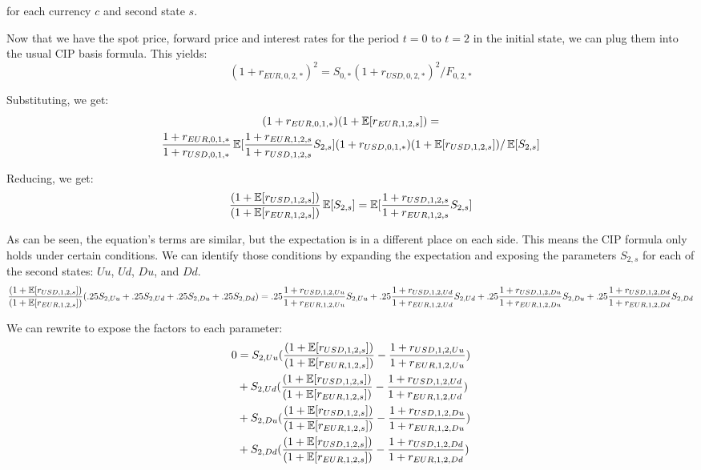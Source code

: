 \noindent for each currency $c$ and second state $s$.

Now that we have the spot price, forward price and interest rates for the period $t=0$ to $t=2$ in the initial state, we can plug them into the usual CIP basis formula.  This yields:
\begin{equation}
  (1 + r_{EUR,0,2,*})^2 = S_{0,*}(1 + r_{USD,0,2,*})^2/F_{0,2,*}
\end{equation}

Substituting, we get:
\begin{multline}
  (1 + r_{EUR,0,1,*})(1 + \operatorname{\mathbb{E}}[r_{EUR,1,2,s}]) =  \\ \frac{1+r_{EUR,0,1,*}}{1 + r_{USD,0,1,*}}\operatorname{\mathbb{E}}[\frac{1+r_{EUR,1,2,s}}{1 + r_{USD,1,2,s}} S_{2,s}](1 + r_{USD,0,1,*})(1 + \operatorname{\mathbb{E}}[r_{USD,1,2,s}])/\operatorname{\mathbb{E}}[S_{2,s}]
\end{multline}

Reducing, we get:
\begin{equation}
  \frac{(1 +\operatorname{\mathbb{E}}[r_{USD,1,2,s}])}{(1 +\operatorname{\mathbb{E}}[r_{EUR,1,2,s}])} \operatorname{\mathbb{E}}[S_{2,s}] = \operatorname{\mathbb{E}}[\frac{1+r_{USD,1,2,s}}{1 + r_{EUR,1,2,s}} S_{2,s}]
\end{equation}

As can be seen, the equation's terms are similar, but the expectation is in a different place on each side.  This means the CIP formula only holds under certain conditions.  We can identify those conditions by expanding the expectation and exposing the parameters $S_{2,s}$ for each of the second states: $Uu$, $Ud$, $Du$, and $Dd$.
\begin{equation}
  \frac{(1 +\operatorname{\mathbb{E}}[r_{USD,1,2,s}])}{(1 +\operatorname{\mathbb{E}}[r_{EUR,1,2,s}])} (.25S_{2,Uu}+.25S_{2,Ud}+.25S_{2,Du}+.25S_{2,Dd})  = 
.25\frac{1+r_{USD,1,2,Uu}}{1 + r_{EUR,1,2,Uu}}S_{2,Uu} + .25\frac{1+r_{USD,1,2,Ud}}{1 + r_{EUR,1,2,Ud}}S_{2,Ud} + .25\frac{1+r_{USD,1,2,Du}}{1 + r_{EUR,1,2,Du}}S_{2,Du} + .25\frac{1+r_{USD,1,2,Dd}}{1 + r_{EUR,1,2,Dd}}S_{2,Dd}
\end{equation}

We can rewrite to expose the factors to each parameter:
\begin{align}
  0 &= S_{2,Uu}( \frac{(1 +\operatorname{\mathbb{E}}[r_{USD,1,2,s}])}{(1 +\operatorname{\mathbb{E}}[r_{EUR,1,2,s}])} - \frac{1+r_{USD,1,2,Uu}}{1 + r_{EUR,1,2,Uu}}) \\
     &+ S_{2,Ud}(\frac{(1 +\operatorname{\mathbb{E}}[r_{USD,1,2,s}])}{(1 +\operatorname{\mathbb{E}}[r_{EUR,1,2,s}])} - \frac{1+r_{USD,1,2,Ud}}{1 + r_{EUR,1,2,Ud}}) \\
     &+ S_{2,Du}(\frac{(1 +\operatorname{\mathbb{E}}[r_{USD,1,2,s}])}{(1 +\operatorname{\mathbb{E}}[r_{EUR,1,2,s}])} - \frac{1+r_{USD,1,2,Du}}{1 + r_{EUR,1,2,Du}}) \\
     &+ S_{2,Dd}(\frac{(1 +\operatorname{\mathbb{E}}[r_{USD,1,2,s}])}{(1 +\operatorname{\mathbb{E}}[r_{EUR,1,2,s}])} - \frac{1+r_{USD,1,2,Dd}}{1 + r_{EUR,1,2,Dd}})
\end{align}

